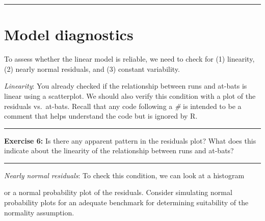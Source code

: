 \documentclass[]{book}
\newenvironment{Shaded}{\begin{snugshade}}{\end{snugshade}}
\newcommand{\KeywordTok}[1]{\textcolor[rgb]{0.13,0.29,0.53}{\textbf{{#1}}}}
\newcommand{\DataTypeTok}[1]{\textcolor[rgb]{0.13,0.29,0.53}{{#1}}}
\newcommand{\DecValTok}[1]{\textcolor[rgb]{0.00,0.00,0.81}{{#1}}}
\newcommand{\StringTok}[1]{\textcolor[rgb]{0.31,0.60,0.02}{{#1}}}
\newcommand{\CommentTok}[1]{\textcolor[rgb]{0.56,0.35,0.01}{\textit{{#1}}}}
\newcommand{\NormalTok}[1]{{#1}}
\theoremstyle{definition}
\theoremstyle{definition}
\theoremstyle{definition}
\theoremstyle{remark}
\begin{document}
\begin{center}\rule{0.5\linewidth}{\linethickness}\end{center}

\section{Model diagnostics}\label{model-diagnostics}

To assess whether the linear model is reliable, we need to check for (1)
linearity, (2) nearly normal residuals, and (3) constant variability.

\emph{Linearity}: You already checked if the relationship between runs
and at-bats is linear using a scatterplot. We should also verify this
condition with a plot of the residuals vs.~at-bats. Recall that any code
following a \emph{\#} is intended to be a comment that helps understand
the code but is ignored by R.

\begin{Shaded}
\end{Shaded}

\begin{center}\rule{0.5\linewidth}{\linethickness}\end{center}

\textbf{Exercise 6:} Is there any apparent pattern in the residuals
plot? What does this indicate about the linearity of the relationship
between runs and at-bats?

\begin{center}\rule{0.5\linewidth}{\linethickness}\end{center}

\emph{Nearly normal residuals}: To check this condition, we can look at
a histogram

\begin{Shaded}
\end{Shaded}

or a normal probability plot of the residuals. Consider simulating
normal probability plots for an adequate benchmark for determining
suitability of the normality assumption.
\end{document}

